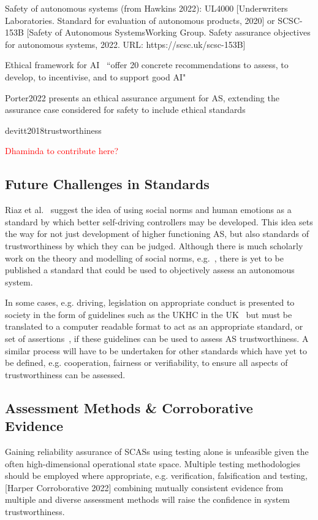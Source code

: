 Safety of autonomous systems (from Hawkins 2022): UL4000 [Underwriters Laboratories. Standard for evaluation of autonomous products, 2020] or SCSC-153B [Safety of Autonomous SystemsWorking Group. Safety assurance objectives for autonomous systems, 2022. URL: https://scsc.uk/scsc-153B]


Ethical framework for AI~\cite{Floridi2018} ``offer 20 concrete recommendations to assess, to develop, to incentivise, and to support good AI"

Porter2022 presents an ethical assurance argument for AS, extending the assurance case considered for safety to include ethical standards

devitt2018trustworthiness 

\textcolor{red}{Dhaminda to contribute here?}

\subsection{Future Challenges in Standards}

Riaz et al.~\cite{Riaz2018} suggest the idea of using social norms and human emotions as a standard by which better self-driving controllers may be developed. This idea sets the way for not just development of higher functioning AS, but also standards of trustworthiness by which they can be judged. Although there is much scholarly work on the theory and modelling of social norms, e.g.~\cite{hechter2001social}, there is yet to be published a standard that could be used to objectively assess an autonomous system. 

In some cases, e.g. driving, legislation on appropriate conduct is presented to society in the form of guidelines such as the UKHC in the UK~\cite{highwayCode} but must be translated to a computer readable format to act as an appropriate standard, or set of assertions~\cite{harper2021safety}, if these guidelines can be used to assess AS trustworthiness. A similar process will have to be undertaken for other standards which have yet to be defined, e.g. cooperation, fairness or verifiability, to ensure all aspects of trustworthiness can be assessed. 



\subsection{Assessment Methods \& Corroborative Evidence}
Gaining reliability assurance of SCASs using testing alone is unfeasible given the often high-dimensional operational state space. Multiple testing methodologies should be employed where appropriate, e.g. verification, falsification and testing, [Harper Corroborative 2022] combining mutually consistent evidence from multiple and diverse assessment methods will raise the confidence in system trustworthiness.

